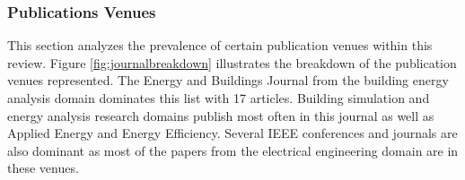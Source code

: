 \subsubsection{Publications Venues}
This section analyzes the prevalence of certain publication venues within this review. Figure \ref{fig:journalbreakdown} illustrates the breakdown of the publication venues represented. The Energy and Buildings Journal from the building energy analysis domain dominates this list with 17 articles. Building simulation and energy analysis research domains publish most often in this journal as well as Applied Energy and Energy Efficiency. Several IEEE conferences and journals are also dominant as most of the papers from the electrical engineering domain are in these venues.